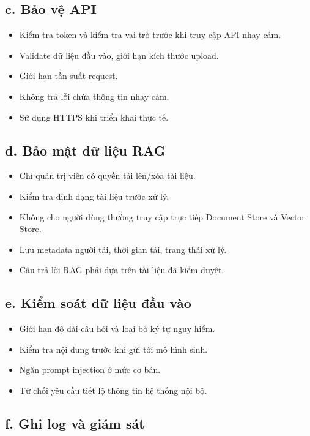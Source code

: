 \documentclass[12pt,a4paper]{report}
\begin{document}
\subsection*{c. Bảo vệ API}

\begin{itemize}
    \item Kiểm tra token và kiểm tra vai trò trước khi truy cập API nhạy cảm.
    \item Validate dữ liệu đầu vào, giới hạn kích thước upload.
    \item Giới hạn tần suất request.
    \item Không trả lỗi chứa thông tin nhạy cảm.
    \item Sử dụng HTTPS khi triển khai thực tế.
\end{itemize}

\subsection*{d. Bảo mật dữ liệu RAG}

\begin{itemize}
    \item Chỉ quản trị viên có quyền tải lên/xóa tài liệu.
    \item Kiểm tra định dạng tài liệu trước xử lý.
    \item Không cho người dùng thường truy cập trực tiếp Document Store và Vector Store.
    \item Lưu metadata người tải, thời gian tải, trạng thái xử lý.
    \item Câu trả lời RAG phải dựa trên tài liệu đã kiểm duyệt.
\end{itemize}

\subsection*{e. Kiểm soát dữ liệu đầu vào}

\begin{itemize}
    \item Giới hạn độ dài câu hỏi và loại bỏ ký tự nguy hiểm.
    \item Kiểm tra nội dung trước khi gửi tới mô hình sinh.
    \item Ngăn prompt injection ở mức cơ bản.
    \item Từ chối yêu cầu tiết lộ thông tin hệ thống nội bộ.
\end{itemize}

\subsection*{f. Ghi log và giám sát}
\end{document}
